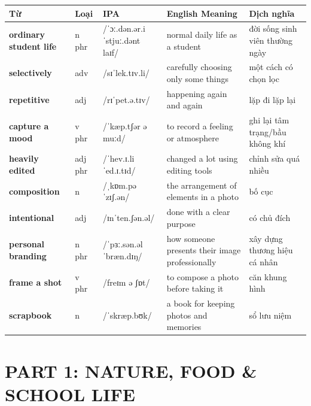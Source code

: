 \vspace{0.8em}
\begin{center}
\renewcommand{\arraystretch}{1.65}
\begin{tabularx}{\textwidth}{|V{0.22\textwidth}|C{0.07\textwidth}|I{0.20\textwidth}|Y|V{0.18\textwidth}|}
\hline
{}
\textbf{Từ} & \textbf{Loại} & \textbf{IPA} & \textbf{English Meaning} & \textbf{Dịch nghĩa} \\
\hline
\textbf{ordinary student life} & n phr & /ˈɔː.dən.ər.i ˈstjuː.dənt laɪf/ & normal daily life as a student & đời sống sinh viên thường ngày \\ \hline
\textbf{selectively} & adv & /sɪˈlek.tɪv.li/ & carefully choosing only some things & một cách có chọn lọc \\ \hline
\textbf{repetitive} & adj & /rɪˈpet.ə.tɪv/ & happening again and again & lặp đi lặp lại \\ \hline
\textbf{capture a mood} & v phr & /ˈkæp.tʃər ə muːd/ & to record a feeling or atmosphere & ghi lại tâm trạng/bầu không khí \\ \hline
\textbf{heavily edited} & adj phr & /ˈhev.ɪ.li ˈed.ɪ.tɪd/ & changed a lot using editing tools & chỉnh sửa quá nhiều \\ \hline
\textbf{composition} & n & /ˌkɒm.pəˈzɪʃ.ən/ & the arrangement of elements in a photo & bố cục \\ \hline
\textbf{intentional} & adj & /ɪnˈten.ʃən.əl/ & done with a clear purpose & có chủ đích \\ \hline
\textbf{personal branding} & n phr & /ˈpɜː.sən.əl ˈbræn.dɪŋ/ & how someone presents their image professionally & xây dựng thương hiệu cá nhân \\ \hline
\textbf{frame a shot} & v phr & /freɪm ə ʃɒt/ & to compose a photo before taking it & căn khung hình \\ \hline
\textbf{scrapbook} & n & /ˈskræp.bʊk/ & a book for keeping photos and memories & sổ lưu niệm \\ \hline
\end{tabularx}
\end{center}

\newpage

\section*{PART 1: NATURE, FOOD \& SCHOOL LIFE}

